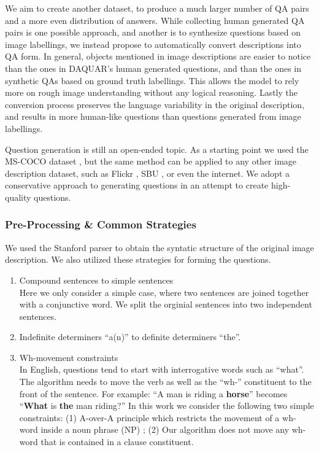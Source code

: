 \documentclass{article}
\renewcommand{\#}[1]{\textbf{#1}}
\begin{document}
We aim to create
another dataset, to produce a much larger number of QA pairs and a more even
distribution of answers. While collecting human generated QA pairs is one
possible approach, and another is to synthesize questions based on image
labellings, we instead propose to automatically convert descriptions 
into QA form. 
In general, objects mentioned in image
descriptions are easier to notice than the ones in DAQUAR's human generated 
questions, and than the ones in synthetic QAs based on ground truth
labellings. 
This allows the 
model to rely more on rough image understanding without any 
logical reasoning. Lastly the conversion process preserves the language variability 
in the original description, and results in more human-like questions than 
questions generated from image labellings.

Question generation is still an open-ended topic.
As a starting point we used the MS-COCO dataset
\cite{mscoco}, but the same method can be applied to any other image
description dataset, such as Flickr \cite{flickr8k}, SBU \cite{ordonez11}, or
even the internet. 
We adopt a conservative approach to generating questions
in an attempt to create high-quality questions.
\subsubsection{Pre-Processing \& Common Strategies}
We used the Stanford parser \cite{klein03} to obtain the syntatic structure 
of the original image description. We also utilized these strategies for forming the questions.
\begin{enumerate}[leftmargin=*]
\item Compound sentences to simple sentences \\
Here we only consider a simple case, where two sentences are joined together 
with a conjunctive word. We split the orginial sentences into two independent sentences. 
\item Indefinite determiners ``a(n)'' to definite determiners ``the''.
\item Wh-movement constraints \\
In English, questions tend to start with interrogative words such as ``what''. 
The algorithm needs to move the verb as well as the ``wh-'' constituent to 
the front of the sentence. 
For example: ``A man is riding a \textbf{horse}'' becomes 
    ``\textbf{What} is \textbf{the} man riding?''
In this work we consider the following two simple 
constraints: (1) A-over-A principle which restricts the movement of a wh-word inside a noun phrase (NP) 
\cite{chomsky73}; (2) Our algorithm does not move any wh-word that is contained in a clause
constituent.
\end{enumerate}
\end{document}
